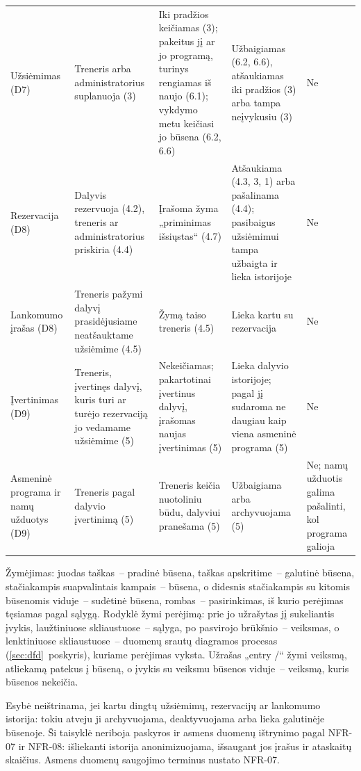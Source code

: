 \begin{longtable}{@{}>{\raggedright\arraybackslash}p{2.4cm}>{\raggedright\arraybackslash}p{3.2cm}>{\raggedright\arraybackslash}p{3.1cm}>{\raggedright\arraybackslash}p{3.2cm}>{\raggedright\arraybackslash}p{2.6cm}@{}}
Užsiėmimas (D7) & Treneris arba administratorius suplanuoja (3) & Iki pradžios keičiamas (3); pakeitus jį ar jo programą, turinys rengiamas iš naujo (6.1); vykdymo metu keičiasi jo būsena (6.2, 6.6) & Užbaigiamas (6.2, 6.6), atšaukiamas iki pradžios (3) arba tampa neįvykusiu (3) & Ne \\ \addlinespace[3pt]
Rezervacija (D8) & Dalyvis rezervuoja (4.2), treneris ar administratorius priskiria (4.4) & Įrašoma žyma „priminimas išsiųstas“ (4.7) & Atšaukiama (4.3, 3, 1) arba pašalinama (4.4); pasibaigus užsiėmimui tampa užbaigta ir lieka istorijoje & Ne \\ \addlinespace[3pt]
Lankomumo įrašas (D8) & Treneris pažymi dalyvį prasidėjusiame neatšauktame užsiėmime (4.5) & Žymą taiso treneris (4.5) & Lieka kartu su rezervacija & Ne \\ \addlinespace[3pt]
Įvertinimas (D9) & Treneris, įvertinęs dalyvį, kuris turi ar turėjo rezervaciją jo vedamame užsiėmime (5) & Nekeičiamas; pakartotinai įvertinus dalyvį, įrašomas naujas įvertinimas (5) & Lieka dalyvio istorijoje; pagal jį sudaroma ne daugiau kaip viena asmeninė programa (5) & Ne \\ \addlinespace[3pt]
Asmeninė programa ir namų užduotys (D9) & Treneris pagal dalyvio įvertinimą (5) & Treneris keičia nuotoliniu būdu, dalyviui pranešama (5) & Užbaigiama arba archyvuojama (5) & Ne; namų užduotis galima pašalinti, kol programa galioja \\
\bottomrule
\end{longtable}
\endgroup

Žymėjimas: juodas taškas~– pradinė būsena, taškas apskritime~– galutinė
būsena, stačiakampis suapvalintais kampais~– būsena, o didesnis stačiakampis
su kitomis būsenomis viduje~– sudėtinė būsena, rombas~– pasirinkimas, iš
kurio perėjimas tęsiamas pagal sąlygą. Rodyklė žymi perėjimą: prie jo
užrašytas jį sukeliantis įvykis, laužtiniuose skliaustuose~– sąlyga, po
pasvirojo brūkšnio~– veiksmas, o lenktiniuose skliaustuose~– duomenų srautų
diagramos procesas (\ref{sec:dfd}~poskyris), kuriame perėjimas vyksta.
Užrašas „entry /“ žymi veiksmą, atliekamą patekus į būseną, o įvykis su
veiksmu būsenos viduje~– veiksmą, kuris būsenos nekeičia.

Esybė neištrinama, jei kartu dingtų užsiėmimų, rezervacijų ar lankomumo
istorija: tokiu atveju ji archyvuojama, deaktyvuojama arba lieka galutinėje
būsenoje. Ši taisyklė neriboja paskyros ir asmens duomenų ištrynimo pagal NFR-07 ir
NFR-08: išliekanti istorija anonimizuojama, išsaugant jos įrašus ir ataskaitų
skaičius. Asmens duomenų saugojimo terminus nustato NFR-07.

